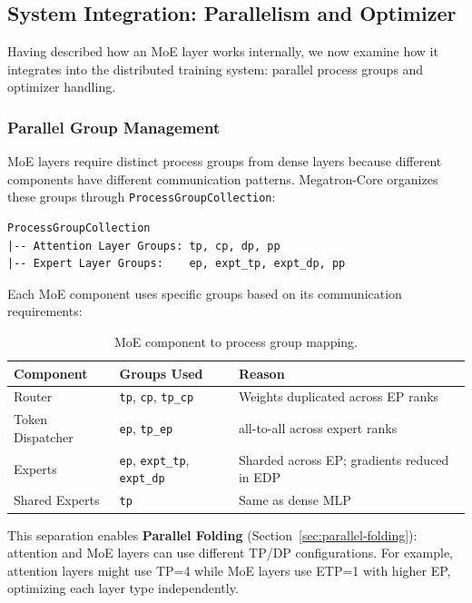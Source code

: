 \documentclass[10pt,logo,copyright]{nvidiatechreport}
\begin{document}
\subsection{System Integration: Parallelism and Optimizer}\label{sec:moe-system-integration}

Having described how an MoE layer works internally, we now examine how it integrates into the distributed training system: parallel process groups and optimizer handling.

\subsubsection{Parallel Group Management}

MoE layers require distinct process groups from dense layers because different components have different communication patterns. Megatron-Core organizes these groups through \texttt{ProcessGroupCollection}:

\begin{lstlisting}
ProcessGroupCollection
|-- Attention Layer Groups: tp, cp, dp, pp
|-- Expert Layer Groups:    ep, expt_tp, expt_dp, pp
\end{lstlisting}

Each MoE component uses specific groups based on its communication requirements:

\begin{table}[ht]
\centering
\begin{tabular}{lll}
\toprule
\textbf{Component} & \textbf{Groups Used} & \textbf{Reason} \\
\midrule
Router & \texttt{tp}, \texttt{cp}, \texttt{tp\_cp} & Weights duplicated across EP ranks \\
Token Dispatcher & \texttt{ep}, \texttt{tp\_ep} & all-to-all across expert ranks \\
Experts & \texttt{ep}, \texttt{expt\_tp}, \texttt{expt\_dp} & Sharded across EP; gradients reduced in EDP \\
Shared Experts & \texttt{tp} & Same as dense MLP \\
\bottomrule
\end{tabular}
\caption{MoE component to process group mapping.}
\label{tab:moe-process-groups}
\end{table}

This separation enables \textbf{Parallel Folding} (Section~\ref{sec:parallel-folding}): attention and MoE layers can use different TP/DP configurations. For example, attention layers might use TP=4 while MoE layers use ETP=1 with higher EP, optimizing each layer type independently.
\end{document}
